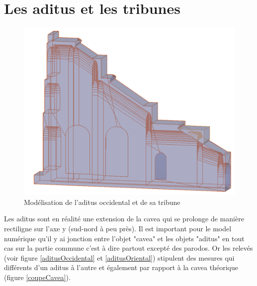 		
		\section{Les \gls{aditus} et les tribunes} 

\begin{figure}[!h]
	\includegraphics[width=\linewidth]{images/modAditus}
	\caption{Modélisation de l'\gls{aditus} occidental et de sa tribune} 
	\label{modAditus} 
\end{figure}  
		
Les aditus sont en réalité une extension de la cavea qui se prolonge de manière rectiligne sur l'axe y (sud-nord à peu près). Il est important pour le model numérique qu'il y ai jonction entre l'objet "cavea" et les objets "aditus" en tout cas sur la partie commune c'est à dire partout excepté des \gls{parodos}. Or les relevés (voir figure \ref{aditusOccidental} et \ref{aditusOriental}) stipulent des mesures qui différents d'un aditus à l'autre et également par rapport à la cavea théorique (figure \ref{coupeCavea}).

